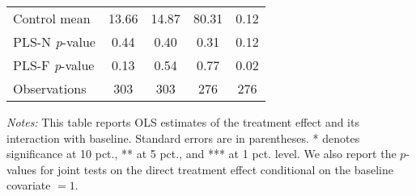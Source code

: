 \begin{table}[ht]
{\begin{threeparttable}
\begin{tabular}{l*{4}{c}}
Control mean    &    13.66         &    14.87         &    80.31         &     0.12         \\
PLS-N \emph{p}-value&     0.44         &     0.40         &     0.31         &     0.12         \\
PLS-F \emph{p}-value&     0.13         &     0.54         &     0.77         &     0.02         \\
Observations    &      303         &      303         &      276         &      276         \\
\bottomrule \end{tabular} \begin{tablenotes}[flushleft] \footnotesize \item \emph{Notes:} This table reports OLS estimates of the treatment effect and its interaction with baseline. Standard errors are in parentheses. * denotes significance at 10 pct., ** at 5 pct., and *** at 1 pct. level. We also report the \(p\)-values for joint tests on the direct treatment effect conditional on the baseline covariate $= 1$. \end{tablenotes} \end{threeparttable} } \end{table}

